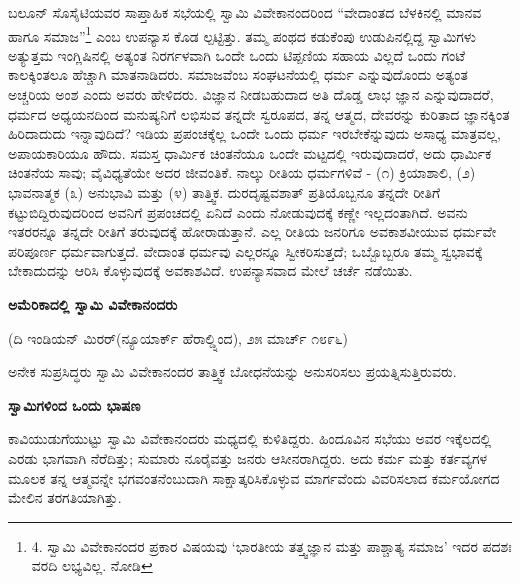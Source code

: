 ಬಲೂನ್ ಸೊಸೈಟಿಯವರ ಸಾಪ್ತಾಹಿಕ ಸಭೆಯಲ್ಲಿ ಸ್ವಾಮಿ ವಿವೇಕಾನಂದರಿಂದ “ವೇದಾಂತದ ಬೆಳಕಿನಲ್ಲಿ ಮಾನವ ಹಾಗೂ ಸಮಾಜ”\footnote{4. ಸ್ವಾಮಿ ವಿವೇಕಾನಂದರ ಪ್ರಕಾರ ವಿಷಯವು ‘ಭಾರತೀಯ ತತ್ತ್ವಜ್ಞಾನ ಮತ್ತು ಪಾಶ್ಚಾತ್ಯ ಸಮಾಜ’ ಇದರ ಪದಶಃ ವರದಿ ಲಭ್ಯವಿಲ್ಲ. ನೋಡಿ } ಎಂಬ ಉಪನ್ಯಾಸ ಕೊಡ ಲ್ಪಟ್ಟಿತ್ತು. ತಮ್ಮ ಪಂಥದ ಕಡುಕೆಂಪು ಉಡುಪಿನಲ್ಲಿದ್ದ ಸ್ವಾಮಿಗಳು ಅತ್ಯುತ್ತಮ ಇಂಗ್ಲಿಷಿನಲ್ಲಿ ಅತ್ಯಂತ ನಿರರ್ಗಳವಾಗಿ ಒಂದೇ ಒಂದು ಟಿಪ್ಪಣಿಯ ಸಹಾಯ ವಿಲ್ಲದೆ ಒಂದು ಗಂಟೆ ಕಾಲಕ್ಕಿಂತಲೂ ಹೆಚ್ಚಾಗಿ ಮಾತನಾಡಿದರು. ಸಮಾಜವೆಂಬ ಸಂಘಟನೆಯಲ್ಲಿ ಧರ್ಮ ಎನ್ನುವುದೊಂದು ಅತ್ಯಂತ ಅಚ್ಚರಿಯ ಅಂಶ ಎಂದು ಅವರು ಹೇಳಿದರು. ವಿಜ್ಞಾನ ನೀಡಬಹುದಾದ ಅತಿ ದೊಡ್ಡ ಲಾಭ ಜ್ಞಾನ ಎನ್ನುವುದಾದರೆ, ಧರ್ಮದ ಅಧ್ಯಯನದಿಂದ ಮನುಷ್ಯನಿಗೆ ಲಭಿಸುವ ತನ್ನದೇ ಸ್ವರೂಪದ, ತನ್ನ ಆತ್ಮದ, ದೇವರನ್ನು ಕುರಿತಾದ ಜ್ಞಾನಕ್ಕಿಂತ ಹಿರಿದಾದುದು ಇನ್ನಾವುದಿದೆ? ಇಡಿಯ ಪ್ರಪಂಚಕ್ಕೆಲ್ಲ ಒಂದೇ ಒಂದು ಧರ್ಮ ಇರಬೇಕೆನ್ನುವುದು ಅಸಾಧ್ಯ ಮಾತ್ರವಲ್ಲ, ಅಪಾಯಕಾರಿಯೂ ಹೌದು. ಸಮಸ್ತ ಧಾರ್ಮಿಕ ಚಿಂತನೆಯೂ ಒಂದೇ ಮಟ್ಟದಲ್ಲಿ ಇರುವುದಾದರೆ, ಅದು ಧಾರ್ಮಿಕ ಚಿಂತನೆಯ ಸಾವು; ವೈವಿಧ್ಯತೆಯೇ ಅದರ ಜೀವಂತಿಕೆ. ನಾಲ್ಕು ರೀತಿಯ ಧರ್ಮಗಳಿವೆ - (೧) ಕ್ರಿಯಾಶಾಲಿ, (೨) ಭಾವನಾತ್ಮಕ (೩) ಅನುಭಾವಿ ಮತ್ತು (೪) ತಾತ್ತ್ವಿಕ. ದುರದೃಷ್ಟವಶಾತ್ ಪ್ರತಿಯೊಬ್ಬನೂ ತನ್ನದೇ ರೀತಿಗೆ ಕಟ್ಟುಬಿದ್ದಿರುವುದರಿಂದ ಅವನಿಗೆ ಪ್ರಪಂಚದಲ್ಲಿ ಏನಿದೆ ಎಂದು ನೋಡುವುದಕ್ಕೆ ಕಣ್ಣೇ ಇಲ್ಲದಂತಾಗಿದೆ. ಅವನು ಇತರರನ್ನೂ ತನ್ನದೇ ರೀತಿಗೆ ತರುವುದಕ್ಕೆ ಹೋರಾಡುತ್ತಾನೆ. ಎಲ್ಲ ರೀತಿಯ ಜನರಿಗೂ ಅವಕಾಶವೀಯುವ ಧರ್ಮವೇ ಪರಿಪೂರ್ಣ ಧರ್ಮವಾಗುತ್ತದೆ. ವೇದಾಂತ ಧರ್ಮವು ಎಲ್ಲರನ್ನೂ ಸ್ವೀಕರಿಸುತ್ತದೆ; ಒಬ್ಬೊಬ್ಬರೂ ತಮ್ಮ ಸ್ವಭಾವಕ್ಕೆ ಬೇಕಾದುದನ್ನು ಆರಿಸಿ ಕೊಳ್ಳುವುದಕ್ಕೆ ಅವಕಾಶವಿದೆ. ಉಪನ್ಯಾಸವಾದ ಮೇಲೆ ಚರ್ಚೆ ನಡೆಯಿತು.

\begin{center}
\textbf{ಅಮೆರಿಕಾದಲ್ಲಿ ಸ್ವಾಮಿ ವಿವೇಕಾನಂದರು}
\end{center}

\begin{center}
(ದಿ ಇಂಡಿಯನ್ ಮಿರರ್(ನ್ಯೂಯಾರ್ಕ್ ಹೆರಾಲ್ಡ್ನಿಂದ), ೨೫ ಮಾರ್ಚ್ ೧೮೯೬)
\end{center}

ಅನೇಕ ಸುಪ್ರಸಿದ್ಧರು ಸ್ವಾಮಿ ವಿವೇಕಾನಂದರ ತಾತ್ತ್ವಿಕ ಬೋಧನೆಯನ್ನು ಅನುಸರಿಸಲು ಪ್ರಯತ್ನಿಸುತ್ತಿರುವರು.

\begin{center}
\textbf{ಸ್ವಾಮಿಗಳಿಂದ ಒಂದು ಭಾಷಣ}
\end{center}

ಕಾವಿಯುಡುಗೆಯುಟ್ಟು ಸ್ವಾಮಿ ವಿವೇಕಾನಂದರು ಮಧ್ಯದಲ್ಲಿ ಕುಳಿತಿದ್ದರು. ಹಿಂದೂವಿನ ಸಭೆಯು ಅವರ ಇಕ್ಕೆಲದಲ್ಲಿ ಎರಡು ಭಾಗವಾಗಿ ನೆರೆದಿತ್ತು; ಸುಮಾರು ನೂರೈವತ್ತು ಜನರು ಆಸೀನರಾಗಿದ್ದರು. ಅದು ಕರ್ಮ ಮತ್ತು ಕರ್ತವ್ಯಗಳ ಮೂಲಕ ತನ್ನ ಆತ್ಮವನ್ನೇ ಭಗವಂತನೆಂಬುದಾಗಿ ಸಾಕ್ಷಾತ್ಕರಿಸಿಕೊಳ್ಳುವ ಮಾರ್ಗವೆಂದು ವಿವರಿಸಲಾದ ಕರ್ಮಯೋಗದ ಮೇಲಿನ ತರಗತಿಯಾಗಿತ್ತು.

